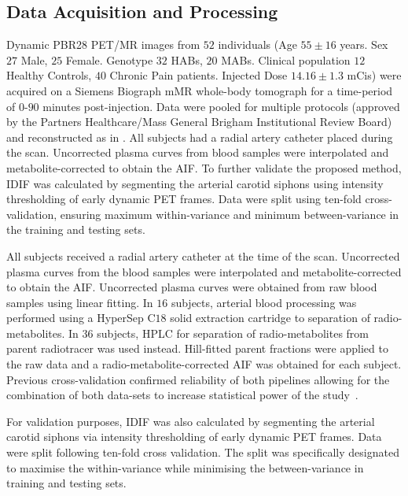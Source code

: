         \subsection{Data Acquisition and Processing} \label{sec:a_bayesian_neural_network-based_method_for_the_extraction_of_a_metabolite_corrected_arterial_input_function_from_dynamic_pbr28_pet_appendix_methods_data_acquisition_and_processing}
            Dynamic \gls{PBR28} \gls{PET}/\gls{MR} images from $52$ individuals (Age $55 \pm 16$ years. Sex $27$ Male, $25$ Female. Genotype $32$ \glspl{HAB}, $20$ \glspl{MAB}. Clinical population $12$ Healthy Controls, $40$ Chronic Pain patients. Injected Dose $14.16 \pm 1.3$ \glspl{mCi}) were acquired on a Siemens Biograph mMR whole-body tomograph for a time-period of $0$-$90$ minutes post-injection. Data were pooled for multiple protocols (approved by the Partners Healthcare/Mass General Brigham Institutional Review Board) and reconstructed as in \parencite{Brusaferri2022ThePandemic}. All subjects had a radial artery catheter placed during the scan. Uncorrected plasma curves from blood samples were interpolated and metabolite-corrected to obtain the \gls{AIF}. To further validate the proposed method, \gls{IDIF} was calculated by segmenting the arterial carotid siphons using intensity thresholding of early dynamic \gls{PET} frames. Data were split using ten-fold cross-validation, ensuring maximum within-variance and minimum between-variance in the training and testing sets.
        
            All subjects received a radial artery catheter at the time of the scan. Uncorrected plasma curves from the blood samples were interpolated and metabolite-corrected to obtain the \gls{AIF}. Uncorrected plasma curves were obtained from raw blood samples using linear fitting. In $16$ subjects, arterial blood processing was performed using a HyperSep C$18$ solid extraction cartridge to separation of radio-metabolites. In $36$ subjects, \gls{HPLC} for separation of radio-metabolites from parent radiotracer was used instead. Hill-fitted parent fractions were applied to the raw data and a radio-metabolite-corrected \gls{AIF} was obtained for each subject. Previous cross-validation confirmed reliability of both pipelines allowing for the combination of both data-sets to increase statistical power of the study~\parencite{Brusaferri2022ThePandemic}. 
            
            For validation purposes, \gls{IDIF} was also calculated by segmenting the arterial carotid siphons via intensity thresholding of early  dynamic \gls{PET} frames. Data were split following ten-fold cross validation. The split was specifically designated to maximise the within-variance while minimising the between-variance in training and testing sets.
        
